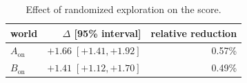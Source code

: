 \begin{table}[!htbp]
\centering
\caption{Effect of randomized exploration on the score.}
\label{tab:explorationscore}
\small
\begin{tabular}{lrr}
\toprule
world & $\Delta$ [95\% interval] & relative reduction \\
\midrule
$A_{\mathrm{on}}$ & $+1.66\;[+1.41, +1.92]$ & 0.57\% \\
$B_{\mathrm{on}}$ & $+1.41\;[+1.12, +1.70]$ & 0.49\% \\
\bottomrule
\end{tabular}
\end{table}

